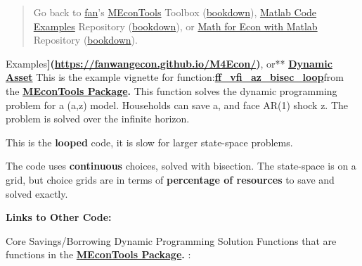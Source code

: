 \documentclass[
]{book}
\begin{document}
\begin{quote}
Go back to \href{http://fanwangecon.github.io/}{fan}'s \href{https://fanwangecon.github.io/MEconTools/}{MEconTools} Toolbox (\href{https://fanwangecon.github.io/MEconTools/bookdown}{bookdown}), \href{https://fanwangecon.github.io/M4Econ/}{Matlab Code Examples} Repository (\href{https://fanwangecon.github.io/M4Econ/bookdown}{bookdown}), or \href{https://fanwangecon.github.io/Math4Econ/}{Math for Econ with Matlab} Repository (\href{https://fanwangecon.github.io/Math4Econ/bookdown}{bookdown}).
\end{quote}

Examples\textbf{{]}(\url{https://fanwangecon.github.io/M4Econ/})}, or** \href{https://fanwangecon.github.io/CodeDynaAsset/}{\textbf{Dynamic
Asset}}
This is the example vignette for function:\href{https://github.com/FanWangEcon/MEconTools/blob/master/MEconTools/vfi/ff_vfi_az_bisec_loop.m}{\textbf{ff\_vfi\_az\_bisec\_loop}}from
the \href{https://fanwangecon.github.io/MEconTools/}{\textbf{MEconTools
Package}}\textbf{.} This function
solves the dynamic programming problem for a (a,z) model. Households can
save a, and face AR(1) shock z. The problem is solved over the infinite
horizon.

This is the \textbf{looped} code, it is slow for larger state-space problems.

The code uses \textbf{continuous} choices, solved with bisection. The
state-space is on a grid, but choice grids are in terms of \textbf{percentage
of resources} to save and solved exactly.

\textbf{Links to Other Code:}

Core Savings/Borrowing Dynamic Programming Solution Functions that are
functions in the \href{https://fanwangecon.github.io/MEconTools/}{\textbf{MEconTools
Package}}\textbf{.} :
\end{document}
